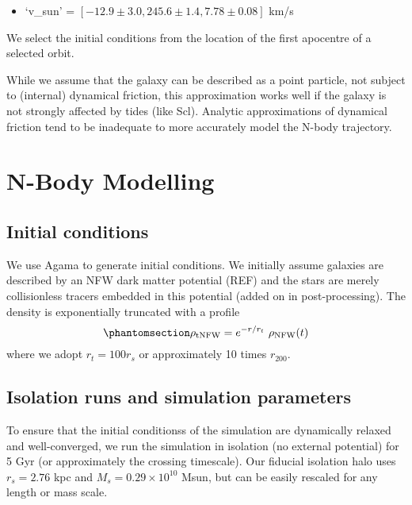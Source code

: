\begin{itemize}
\tightlist
\item
  `v\_sun' = \([-12.9 \pm 3.0, 245.6 \pm 1.4, 7.78 \pm 0.08]\) km/s
\end{itemize}

We select the initial conditions from the location of the first
apocentre of a selected orbit.

While we assume that the galaxy can be described as a point particle,
not subject to (internal) dynamical friction, this approximation works
well if the galaxy is not strongly affected by tides (like Scl).
Analytic approximations of dynamical friction tend to be inadequate to
more accurately model the N-body trajectory.

\section{N-Body Modelling}\label{n-body-modelling}

\subsection{Initial conditions}\label{initial-conditions}

We use Agama \citep{agama} to generate initial conditions. We initially
assume galaxies are described by an NFW dark matter potential (REF) and
the stars are merely collisionless tracers embedded in this potential
(added on in post-processing). The density is exponentially truncated
with a profile
\begin{equation}\protect\phantomsection\label{eq:trunc_nfw}{
\rho_{\rm tNFW} = e^{-r/r_t}\ \rho_{\rm NFW}(t)
}\end{equation} where we adopt \(r_t = 100 r_s\) or approximately 10
times \(r_{200}\).

\subsection{Isolation runs and simulation
parameters}\label{isolation-runs-and-simulation-parameters}

To ensure that the initial conditionss of the simulation are dynamically
relaxed and well-converged, we run the simulation in isolation (no
external potential) for 5 Gyr (or approximately the crossing timescale).
Our fiducial isolation halo uses \(r_s=2.76\) kpc and
\(M_s = 0.29 \times 10^{10}\) Msun, but can be easily rescaled for any
length or mass scale.


